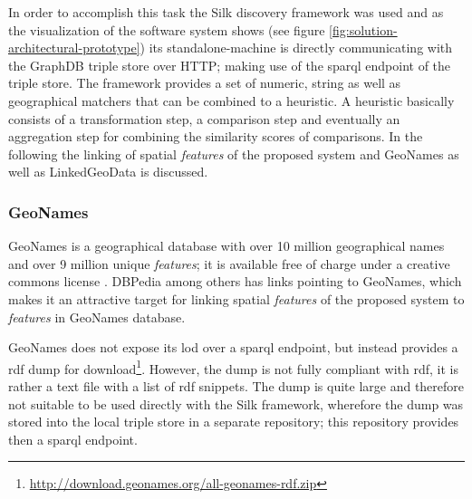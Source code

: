 \documentclass[draft,final]{vutinfth} %
\begin{document}
In order to accomplish this task the Silk discovery framework\cite{volz_discovering_2009} was used and as the visualization of the software system shows (see figure \ref{fig:solution-architectural-prototype}) its standalone-machine is directly communicating with the GraphDB triple store over HTTP; making use of the \gls{sparql} endpoint of the triple store. The framework provides a set of numeric, string as well as geographical matchers that can be combined to a heuristic. A heuristic basically consists of a transformation step, a comparison step and eventually an aggregation step for combining the similarity scores of comparisons. In the following the linking of spatial \textit{features} of the proposed system and GeoNames as well as LinkedGeoData is discussed.

\subsubsection{GeoNames}

GeoNames is a geographical database with over 10 million geographical names and over 9 million unique \textit{features}; it is available free of charge under a creative commons license \cite{volz_discovering_2009}. DBPedia among others has links pointing to GeoNames, which makes it an attractive target for linking spatial \textit{features} of the proposed system to \textit{features} in GeoNames database.  

GeoNames does not expose its \gls{lod} over a \gls{sparql} endpoint, but instead provides a \gls{rdf} dump for download\footnote{\url{http://download.geonames.org/all-geonames-rdf.zip}}. However, the dump is not fully compliant with \gls{rdf}, it is rather a text file with a list of \gls{rdf} snippets. The dump is quite large and therefore not suitable to be used directly with the Silk framework, wherefore the dump was stored into the local triple store in a separate repository; this repository provides then a \gls{sparql} endpoint. 
\end{document}
